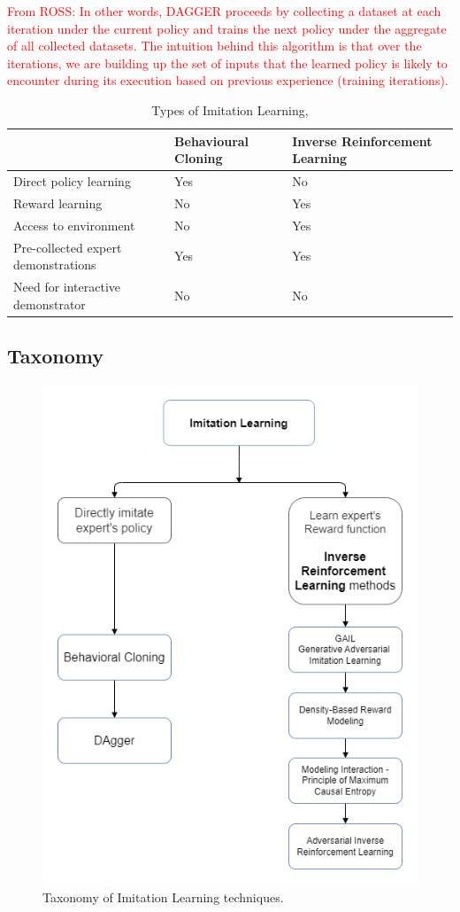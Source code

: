 \documentclass{article}
\begin{document}
\textcolor{red}{From ROSS: In other words, DAGGER proceeds by collecting a dataset 	at each iteration under the current policy and trains the next 	policy under the aggregate of all collected datasets. The intuition 	behind this algorithm is that over the iterations, we 	are building up the set of inputs that the learned policy is 	likely to encounter during its execution based on previous experience (training iterations).}

\begingroup
\setlength{\tabcolsep}{6pt}
\begin{table}[h!]
	\centering
	\renewcommand{\arraystretch}{1.5} 
	\begin{tabular}{L{6cm} L{3cm} L{3cm}}
		\midrule[0.01pt]
		& \textbf{Behavioural Cloning} & \textbf{Inverse Reinforcement Learning}\\
		\midrule[0.01pt]
		Direct policy learning & Yes & No \\
		Reward learning & No & Yes \\
		Access to environment & No & Yes \\
		Pre-collected expert demonstrations & Yes & Yes \\
		Need for interactive demonstrator & No & No \\
		\midrule[0.01pt]
	\end{tabular}
	\caption{Types of Imitation Learning, \cite{yue2018imitation}}
	\label{tbl:BC_IRL}
\end{table}
\endgroup

\subsection{Taxonomy}\label{sec:Taxonomy}

\begin{figure}[H]
	\centering
	\includegraphics[width=0.4\linewidth]{images/IRL_Taxonomy.png}
	\caption{Taxonomy of Imitation Learning techniques.}
	\label{fig:taxonomy}
\end{figure}
\end{document}
